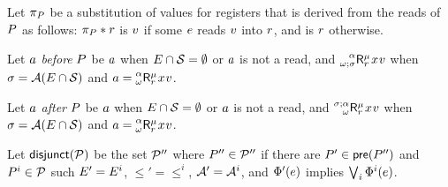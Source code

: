 \begin{definition}
  \label{def:semi:seq}
Let $\pi_{P}$ be a substitution of values for registers that is derived
from the reads of $P$ as follows: $\pi_{P}\mathbin{\ast}r$ is $v$
if some $e$ reads $v$ into $r$, and is $r$ otherwise.

  Let $a$ \emph{before} $P$ be $a$ when $E\cap\mathcal{S}=\emptyset$
  or $a$ is not a read, and
  $\DRreg[\amode]{\aReg}{\beforeSub}{\afterSub\SUBSEQ\aSub}{\aLoc}{\aVal}$
  when 
  $\sigma=\mathcal{A}(E\cap\mathcal{S})$
  and
  $\aAct=\DRreg[\amode]{\aReg}{\beforeSub}{\afterSub}{\aLoc}{\aVal}$.

  Let $a$ \emph{after} $P$ be $a$ when $E\cap\mathcal{S}=\emptyset$
  or $a$ is not a read, and
  $\DRreg[\amode]{\aReg}{\aSub\SUBSEQ\beforeSub}{\afterSub}{\aLoc}{\aVal}$
  when 
  $\sigma=\mathcal{A}(E\cap\mathcal{S})$
  and
  $\aAct=\DRreg[\amode]{\aReg}{\beforeSub}{\afterSub}{\aLoc}{\aVal}$.





  
  Let $\mathsf{disjunct}(\mathcal{P})$ be the set $\mathcal{P}''$ where $P''\in\mathcal{P}''$ if
  there are $P'\in\mathsf{pre}(P'')$ and $P^i\in\mathcal{P}$ such
  $E' = E^i$, ${\le'}={\le^i}$, $\mathcal{A}'=\mathcal{A}^i$, and
  $\Phi'(e)$ implies $\bigvee_i \Phi^i(e)$.
  

\end{definition}
